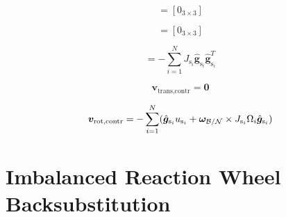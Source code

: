 \documentclass[]{BasiliskReportMemo}
\begin{document}
\begin{equation}
[B_\text{contr}] = [0_{3 \times 3}]
\end{equation}

\begin{equation}
[C_\text{contr}] = [0_{3 \times 3}]
\end{equation}

\begin{equation}
[D_\text{contr}] = -\sum_{i=1}^{N}J_{\text{s}_i} \hat{\bm g}_{\text{s}_i} \hat{\bm g}_{\text{s}_i}^T
\end{equation}

\begin{equation}
\bm v_{\text{trans,contr}} = \bm 0
\end{equation}

\begin{equation}
\bm v_{\text{rot,contr}} =  - \sum_{i=1}^{N}(\hat{\bm g}_{\text{s}_i} u_{\text{s}_i} + \bm\omega_{\cal B/N}\times J_{\text{s}_i}\Omega_i\hat{\bm g}_{\text{s}_i})
\end{equation}

\section{Imbalanced Reaction Wheel Backsubstitution}
\end{document}
